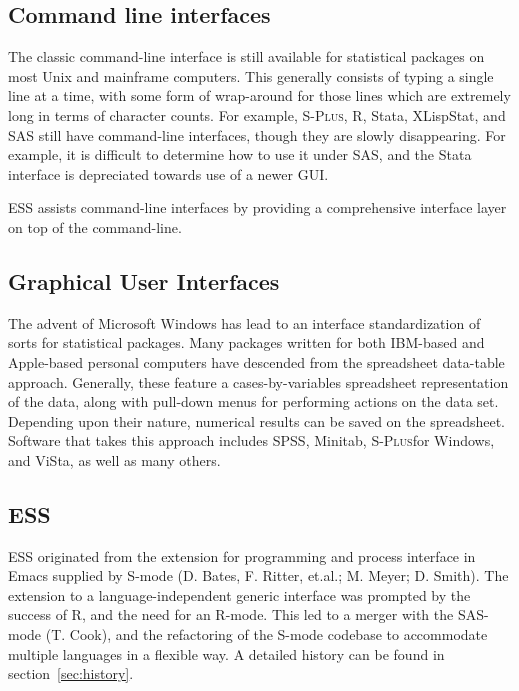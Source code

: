 \documentclass{article}
\newcommand*{\Splus}{\textsc{S-Plus}}
\begin{document}
\subsection{Command line interfaces}
\label{sec:UI:command}

The classic command-line interface is still available for statistical
packages on most Unix and mainframe computers.  This generally
consists of typing a single line at a time, with some form of
wrap-around for those lines which are extremely long in terms of
character counts.  For example, \Splus, R, Stata, XLispStat, and SAS
still have command-line interfaces, though they are slowly
disappearing.  For example, it is difficult to determine how to use
it under SAS, and the Stata interface is depreciated towards use of a
newer GUI.

ESS assists command-line interfaces by providing a comprehensive
interface layer on top of the command-line.

\subsection{Graphical User Interfaces}
\label{sec:UI:GUI}

The advent of Microsoft Windows has lead to an interface
standardization of sorts for statistical packages.  Many packages
written for both IBM-based and Apple-based personal computers have
descended from the spreadsheet data-table approach.  Generally, these
feature a cases-by-variables spreadsheet representation of the data,
along with pull-down menus for performing actions on the data set.
Depending upon their nature, numerical results can be saved on the
spreadsheet.  Software that takes this approach includes SPSS,
Minitab, \Splus for Windows, and ViSta, as well as many others.  

\subsection{ESS}
\label{sec:UI:ESS}

ESS originated from the extension for programming and process
interface in Emacs supplied by S-mode (D. Bates, F. Ritter, et.al.; 
M. Meyer; D. Smith).  The extension to a language-independent generic
interface was prompted by the success of R, and the need for an
R-mode.  This led to a merger with the SAS-mode (T. Cook), and the
refactoring of the S-mode codebase to accommodate multiple languages
in a flexible way.  A detailed history can be found in
section~\ref{sec:history}.
\end{document}
